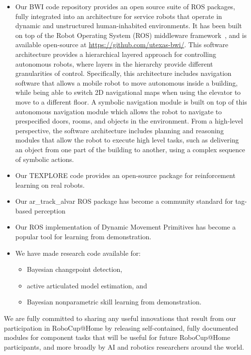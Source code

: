 \begin{itemize}

\item Our BWI code repository provides an open source suite of ROS
packages, fully integrated into an architecture for service robots
that operate in dynamic and unstructured human-inhabited environments.
It has been built on top of the Robot Operating System (ROS)
middleware framework~\cite{quigley2009ros}, and is available
open-source at \url{https://github.com/utexas-bwi/}. This software
architecture provides a hierarchical layered approach for controlling
autonomous robots, where layers in the hierarchy provide different
granularities of control.  Specifically, this architecture includes
navigation software that allows a mobile robot to move autonomous
inside a building, while being able to switch 2D navigational maps
when using the elevator to move to a different floor. A symbolic
navigation module is built on top of this autonomous navigation module
which allows the robot to navigate to prespecified doors, rooms, and
objects in the environment.  From a high-level perspective, the software
architecture includes planning and reasoning modules that allow the
robot to execute high level tasks, such as delivering an object from
one part of the building to another, using a complex sequence of
symbolic actions.

\item Our TEXPLORE code provides an open-source package for
reinforcement learning on real robots.

\item Our ar\_track\_alvar ROS package has become a community standard
for tag-based perception

\item Our ROS implementation of Dynamic Movement Primitives has become
a popular tool for learning from demonstration.

\item We have made research code available for:

  \begin{itemize}
  \item Bayesian changepoint detection,
  \item active articulated model estimation, and
  \item Bayesian nonparametric skill learning from demonstration.
  \end{itemize}

\end{itemize}


We are fully committed to sharing any useful innovations that result
from our participation in RoboCup@Home by releasing self-contained,
fully documented modules for component tasks that will be useful for
future RoboCup@Home participants, and more broadly by AI and robotics
researchers around the world.
